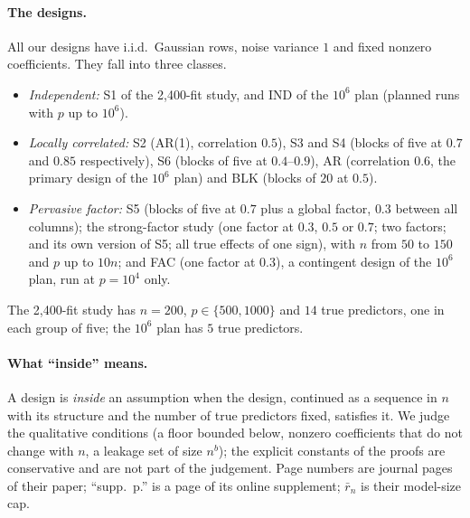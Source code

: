 \paragraph{The designs.} All our designs have i.i.d.\ Gaussian rows, noise variance $1$ and fixed nonzero coefficients.
They fall into three classes.
\begin{itemize}[leftmargin=1.5em,itemsep=1pt]
  \item \emph{Independent:} S1 of the 2,400-fit study, and IND of the $10^6$ plan (planned runs with $p$ up to $10^6$).
  \item \emph{Locally correlated:} S2 (AR(1), correlation $0.5$), S3 and S4 (blocks of five at $0.7$ and $0.85$ respectively), S6 (blocks of
    five at $0.4$--$0.9$), AR (correlation $0.6$, the primary design of the $10^6$ plan) and BLK (blocks of $20$ at
    $0.5$).
  \item \emph{Pervasive factor:} S5 (blocks of five at $0.7$ plus a global factor, $0.3$ between all columns); the
    strong-factor study (one factor at $0.3$, $0.5$ or $0.7$; two factors; and its own version of S5; all true effects of
    one sign), with $n$ from $50$ to $150$ and $p$ up to $10n$; and FAC (one factor at $0.3$), a
    contingent design of the $10^6$ plan, run at $p=10^4$ only.
\end{itemize}
The 2,400-fit study has $n=200$, $p\in\{500,1000\}$ and $14$ true predictors, one in each group of five; the $10^6$ plan
has $5$ true predictors.

\paragraph{What ``inside'' means.} A design is \emph{inside} an assumption when the design, continued as a sequence in
$n$ with its structure and the number of true predictors fixed, satisfies it. We judge the qualitative conditions (a
floor bounded below, nonzero coefficients that do not change with $n$, a leakage set of size $n^b$); the explicit
constants of the proofs are conservative and are not part of the judgement. Page numbers are journal pages of their paper; ``supp.\ p.'' is a page of its online supplement; $\bar r_n$ is
their model-size cap.


